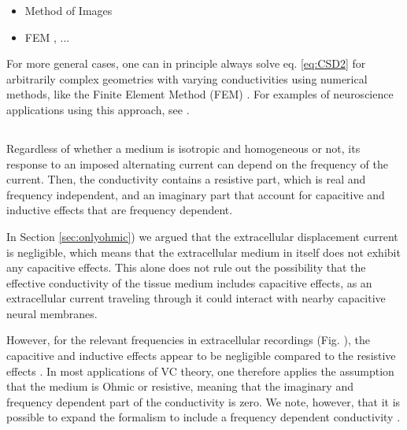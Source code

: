 \begin{itemize}
\item Method of Images \citep{Ness2015}
\item FEM \citep{Ness2015}, ...
\end{itemize}

For more general cases, one can in principle always solve eq. \ref{eq:CSD2} for arbitrarily complex geometries with varying conductivities using numerical methods, like the Finite Element Method (FEM) \citep{Logg2012}. For examples of neuroscience applications using this approach, see \cite{Moffitt2005, Frey2009, Joucla2012, Haufe2015, Ness2015, Buccino2019b, Obien2019}. 


\subsection{ }
\label{sec:f-independent}
Regardless of whether a medium is isotropic and homogeneous or not, its response to an imposed alternating current can depend on the frequency of the current. Then, the conductivity contains a resistive part, which is real and frequency independent, and an imaginary part that account for capacitive and inductive effects that are frequency dependent. 

In Section \ref{sec:onlyohmic}) we argued that the extracellular displacement current is negligible, which means that the extracellular medium in itself does not exhibit any capacitive effects. This alone does not rule out the possibility that the effective conductivity of the tissue medium includes capacitive effects, as an extracellular current traveling through it could interact with nearby capacitive neural membranes. 

However, for the relevant frequencies in extracellular recordings (Fig. \label{Sigma:fig:freq_dep}), the capacitive and inductive effects appear to be negligible compared to the resistive effects \cite{Logothetis2007, Miceli2017, Ranta2017}. In most applications of VC theory, one therefore applies the assumption that the medium is Ohmic or resistive, meaning that the imaginary and frequency dependent part of the conductivity is zero. We note, however, that it is possible to expand the formalism to include a frequency dependent conductivity \cite{Bedard2004, Tracey2011, Miceli2017}. 


